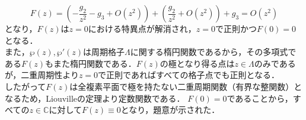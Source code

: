 \documentclass[dvipdfmx]{jsreport}
\begin{document}
\begin{equation*}
    F(z) = \left(-\frac{g_2}{z^2}- g_3+ O(z^2)\right) + \left(\frac{g_2}{z^2} + O(z^2)\right) + g_3 = O(z^2)
\end{equation*}
    となり，$F(z)$は$z=0$における特異点が解消され，$z=0$で正則かつ$F(0)=0$となる．\\
    また，$\wp(z), \wp'(z)$は周期格子$\Lambda$に関する楕円関数であるから，その多項式である$F(z)$もまた楕円関数である．$F(z)$の極となり得る点は$z \in \Lambda$のみであるが，二重周期性より$z=0$で正則であればすべての格子点でも正則となる．\\
    したがって$F(z)$は全複素平面で極を持たない二重周期関数（有界な整関数）となるため，Liouvilleの定理より定数関数である．
    $F(0) = 0$であることから，すべての$z \in \mathbb{C}$に対して$F(z) \equiv 0$となり，題意が示された．
\end{document}
